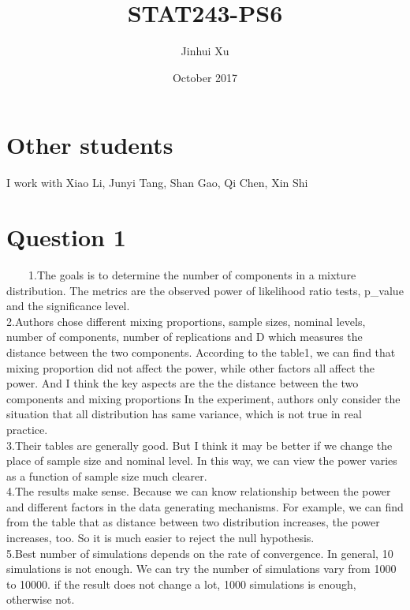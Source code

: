 \documentclass{article}\usepackage[]{graphicx}\usepackage[]{color}
\begin{document}
 
\title{STAT243-PS6}
\author{Jinhui Xu}
\date{October 2017}

\maketitle

\section{Other students}
I work with Xiao Li, Junyi Tang, Shan Gao, Qi Chen, Xin Shi

\section{Question 1}
\ \ \ \ 1.The goals is to determine the number of components in a mixture distribution.
  The metrics are the observed power of likelihood ratio tests, p\_value and the significance level.\\

2.Authors chose different mixing proportions, sample sizes, nominal levels, number of components, number of replications and D which measures the distance between the two components.
  According to the table1, we can find that mixing proportion did not affect the power, while other factors all affect the power. And I think the key aspects are the the distance between the two components and mixing proportions
  In the experiment, authors only consider the situation that all distribution has same variance, which is not true in real practice.\\
  
3.Their tables are generally good. But I think it may be better if we change the place of sample size and nominal level. In this way, we can view the power varies as a function of sample size much clearer.\\

4.The results make sense. Because we can know relationship between the power and different  factors in the data generating mechanisms.
  For example, we can find from the table that as distance between two distribution increases, the power increases, too. So it is much easier to reject the null hypothesis.\\
  
5.Best number of simulations depends on the rate of convergence. In general, 10 simulations is not enough. We can try the number of simulations vary from 1000 to 10000. if the result does not change a lot, 1000 simulations is enough, otherwise not.
\end{document}
